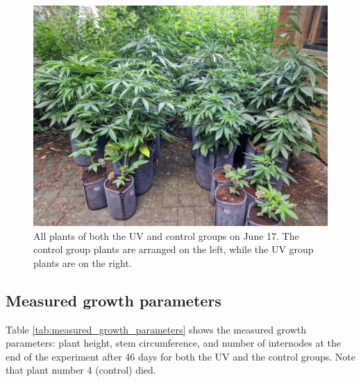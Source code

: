 \begin{figure}[H]
    \includegraphics[width=\linewidth]{plant_all_2024-06-17}
    \caption[Plants of both the UV and control groups on June 17]{All plants of both the UV and control groups on June 17. The control group plants are arranged on the left, while the UV group plants are on the right.}
    \label{fig:plant_all_2024-06-17}
\end{figure}

\subsection{Measured growth parameters}

Table \ref{tab:measured_growth_parameters} shows the measured growth parameters: plant height, stem circumference, and number of internodes at the end of the experiment after \num[mode=text]{46} days for both the UV and the control groups. Note that plant number \num[mode=text]{4} (control) died.

